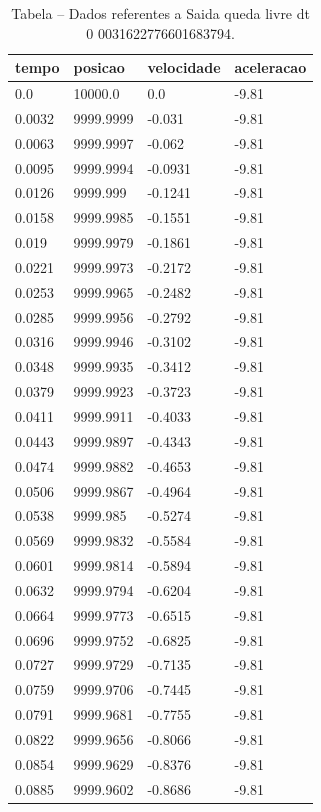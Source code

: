 \begin{table}[H]
\centering
\caption{Tabela – Dados referentes a Saida queda livre dt 0 0031622776601683794.}
\label{tab:saida_queda_livre_dt_0_0031622776601683794}
\begin{tabular}{llll}
\toprule
tempo & posicao & velocidade & aceleracao \\
\midrule
0.0 & 10000.0 & 0.0 & -9.81 \\
0.0032 & 9999.9999 & -0.031 & -9.81 \\
0.0063 & 9999.9997 & -0.062 & -9.81 \\
0.0095 & 9999.9994 & -0.0931 & -9.81 \\
0.0126 & 9999.999 & -0.1241 & -9.81 \\
0.0158 & 9999.9985 & -0.1551 & -9.81 \\
0.019 & 9999.9979 & -0.1861 & -9.81 \\
0.0221 & 9999.9973 & -0.2172 & -9.81 \\
0.0253 & 9999.9965 & -0.2482 & -9.81 \\
0.0285 & 9999.9956 & -0.2792 & -9.81 \\
0.0316 & 9999.9946 & -0.3102 & -9.81 \\
0.0348 & 9999.9935 & -0.3412 & -9.81 \\
0.0379 & 9999.9923 & -0.3723 & -9.81 \\
0.0411 & 9999.9911 & -0.4033 & -9.81 \\
0.0443 & 9999.9897 & -0.4343 & -9.81 \\
0.0474 & 9999.9882 & -0.4653 & -9.81 \\
0.0506 & 9999.9867 & -0.4964 & -9.81 \\
0.0538 & 9999.985 & -0.5274 & -9.81 \\
0.0569 & 9999.9832 & -0.5584 & -9.81 \\
0.0601 & 9999.9814 & -0.5894 & -9.81 \\
0.0632 & 9999.9794 & -0.6204 & -9.81 \\
0.0664 & 9999.9773 & -0.6515 & -9.81 \\
0.0696 & 9999.9752 & -0.6825 & -9.81 \\
0.0727 & 9999.9729 & -0.7135 & -9.81 \\
0.0759 & 9999.9706 & -0.7445 & -9.81 \\
0.0791 & 9999.9681 & -0.7755 & -9.81 \\
0.0822 & 9999.9656 & -0.8066 & -9.81 \\
0.0854 & 9999.9629 & -0.8376 & -9.81 \\
0.0885 & 9999.9602 & -0.8686 & -9.81 \\

\end{tabular}
\end{table}
